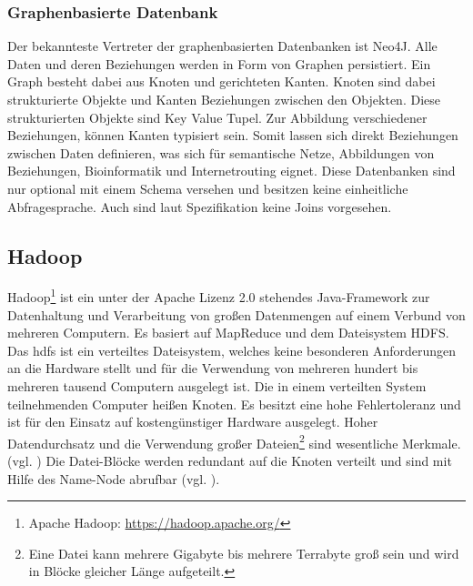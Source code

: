 \subsubsection{Graphenbasierte Datenbank}
Der bekannteste Vertreter der graphenbasierten Datenbanken ist Neo4J.
Alle Daten und deren Beziehungen werden in Form von Graphen persistiert.
Ein Graph besteht dabei aus Knoten und gerichteten Kanten.
Knoten sind dabei strukturierte Objekte und Kanten Beziehungen zwischen den Objekten.
Diese strukturierten Objekte sind Key Value Tupel.
Zur Abbildung verschiedener Beziehungen, können Kanten typisiert sein.
Somit lassen sich direkt Beziehungen zwischen Daten definieren, was sich für semantische Netze, Abbildungen von Beziehungen, Bioinformatik und Internetrouting eignet.
Diese Datenbanken sind nur optional mit einem Schema versehen und besitzen keine einheitliche Abfragesprache.
Auch sind laut Spezifikation keine Joins vorgesehen.


\subsection{Hadoop}
\label{hadoop}
Hadoop\footnote{Apache Hadoop: \url{https://hadoop.apache.org/}} ist ein unter der Apache Lizenz 2.0 stehendes Java-Framework zur Datenhaltung und Verarbeitung von großen Datenmengen auf einem Verbund von mehreren Computern.
Es basiert auf MapReduce und dem Dateisystem HDFS.
Das \Gls{hdfs} ist ein verteiltes Dateisystem, welches keine besonderen Anforderungen an die Hardware stellt und für die Verwendung von mehreren hundert bis mehreren tausend Computern ausgelegt ist.
Die in einem verteilten System teilnehmenden Computer heißen Knoten.
Es besitzt eine hohe Fehlertoleranz und ist für den Einsatz auf kostengünstiger Hardware ausgelegt.
Hoher Datendurchsatz und die Verwendung großer Dateien\footnote{Eine Datei kann mehrere Gigabyte bis mehrere Terrabyte groß sein und wird in Blöcke gleicher Länge aufgeteilt.} sind wesentliche Merkmale. (vgl. \cite[S.3]{paper:hadoop})
Die Datei-Blöcke werden redundant auf die Knoten verteilt und sind mit Hilfe des Name-Node abrufbar (vgl. \cite[S.7]{ba:dan}).

